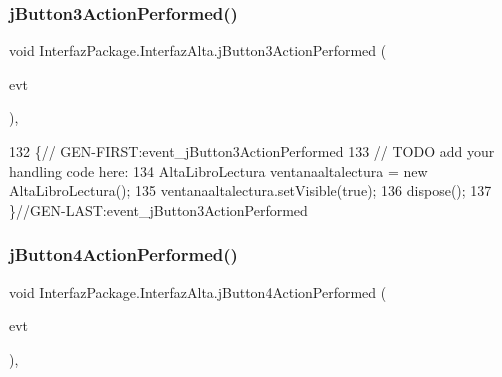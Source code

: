 \subsubsection{\texorpdfstring{j\+Button3\+Action\+Performed()}{jButton3ActionPerformed()}}
{\footnotesize\ttfamily void Interfaz\+Package.\+Interfaz\+Alta.\+j\+Button3\+Action\+Performed (\begin{DoxyParamCaption}\item[{java.\+awt.\+event.\+Action\+Event}]{evt }\end{DoxyParamCaption})\hspace{0.3cm}{\ttfamily [inline]}, {\ttfamily [private]}}


\begin{DoxyCode}
132                                                                          \{\textcolor{comment}{//
      GEN-FIRST:event\_jButton3ActionPerformed}
133         \textcolor{comment}{// TODO add your handling code here:}
134         AltaLibroLectura ventanaaltalectura = \textcolor{keyword}{new} AltaLibroLectura();
135         ventanaaltalectura.setVisible(\textcolor{keyword}{true});
136         dispose();
137     \}\textcolor{comment}{//GEN-LAST:event\_jButton3ActionPerformed}
\end{DoxyCode}
\mbox{\label{class_interfaz_package_1_1_interfaz_alta_a11278134da20d54ada1b395cba82595a}} 
\subsubsection{\texorpdfstring{j\+Button4\+Action\+Performed()}{jButton4ActionPerformed()}}
{\footnotesize\ttfamily void Interfaz\+Package.\+Interfaz\+Alta.\+j\+Button4\+Action\+Performed (\begin{DoxyParamCaption}\item[{java.\+awt.\+event.\+Action\+Event}]{evt }\end{DoxyParamCaption})\hspace{0.3cm}{\ttfamily [inline]}, {\ttfamily [private]}}


